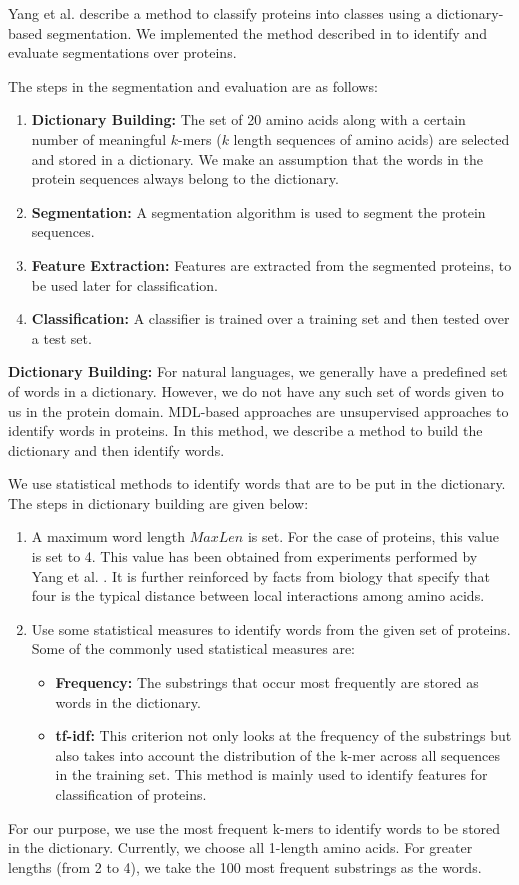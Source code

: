 \documentclass[runningheads]{llncs}
\begin{document}
Yang et al. \cite{yang2008classification} describe a method to classify proteins into classes using a dictionary-based segmentation. We implemented the method described in \cite{yang2008classification} to identify and evaluate segmentations over proteins.

The steps in the segmentation and evaluation are as follows:
\begin{enumerate}
    \item \textbf{Dictionary Building:} The set of 20 amino acids along with a certain number of meaningful $k$-mers ($k$ length sequences of amino acids) are selected and stored in a dictionary. We make an assumption that the words in the protein sequences always belong to the dictionary.
    \item \textbf{Segmentation:} A segmentation algorithm is used to segment the protein sequences.
    \item \textbf{Feature Extraction:} Features are extracted from the segmented proteins, to be used later for classification.
    \item \textbf{Classification:} A classifier is trained over a training set and then tested over a test set.
\end{enumerate}

\textbf{Dictionary Building:} For natural languages, we generally have a predefined set of words in a dictionary. However, we do not have any such set of words given to us in the protein domain. MDL-based approaches are unsupervised approaches to identify words in proteins. In this method, we describe a method to build the dictionary and then identify words. 

We use statistical methods to identify words that are to be put in the dictionary. The steps in dictionary building are given below:
\begin{enumerate}
    \item A maximum word length $MaxLen$ is set. For the case of proteins, this value is set to 4. This value has been obtained from experiments performed by Yang et al. \cite{yang2008classification}. It is further reinforced by facts from biology that specify that four is the typical distance between local interactions among amino acids.
    \item Use some statistical measures to identify words from the given set of proteins. Some of the commonly used statistical measures are:
    \begin{itemize}
        \item \textbf{Frequency:} The substrings that occur most frequently are stored as words in the dictionary.
        \item \textbf{tf-idf:} This criterion not only looks at the frequency of the substrings but also takes into account the distribution of the k-mer across all sequences in the training set. This method is mainly used to identify features for classification of proteins.
    \end{itemize}
\end{enumerate}
For our purpose, we use the most frequent k-mers to identify words to be stored in the dictionary. Currently, we choose all 1-length amino acids. For greater lengths (from 2 to 4), we take the 100 most frequent substrings as the words.
\end{document}
